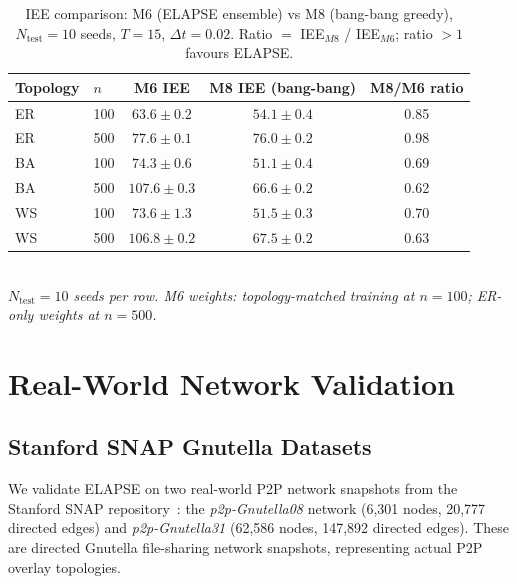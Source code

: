 \documentclass[review,12pt]{elsarticle}
\begin{document}
\begin{table}[htbp]
  \caption{IEE comparison: M6 (ELAPSE ensemble) vs M8 (bang-bang greedy),
           $N_{\mathrm{test}}=10$ seeds, $T=15$, $\Delta t=0.02$.
           Ratio $=$ IEE$_{M8}$ / IEE$_{M6}$; ratio $>1$ favours ELAPSE.}
  \label{tab:greedy}
  \centering
  \small
  \renewcommand{\arraystretch}{1.2}
  \begin{tabular}{llccc}
    \toprule
    Topology & $n$ & M6 IEE & M8 IEE (bang-bang) & M8/M6 ratio \\
    \midrule
    ER & 100 & $63.6\pm 0.2$ & $54.1\pm 0.4$ & 0.85 \\
    ER & 500 & $77.6\pm 0.1$ & $76.0\pm 0.2$ & 0.98 \\
    BA & 100 & $74.3\pm 0.6$ & $51.1\pm 0.4$ & 0.69 \\
    BA & 500 & $107.6\pm 0.3$ & $66.6\pm 0.2$ & 0.62 \\
    WS & 100 & $73.6\pm 1.3$ & $51.5\pm 0.3$ & 0.70 \\
    WS & 500 & $106.8\pm 0.2$ & $67.5\pm 0.2$ & 0.63 \\
    \bottomrule
  \end{tabular}
  \smallskip\\
  \small\textit{$N_{\mathrm{test}}=10$ seeds per row. M6 weights: topology-matched training
  at $n=100$; ER-only weights at $n=500$.}
\end{table}

\section{Real-World Network Validation}
\label{sec:snap}

\subsection{Stanford SNAP Gnutella Datasets}

We validate ELAPSE on two real-world P2P network snapshots from the
Stanford SNAP repository~\cite{snapnets,leskovec2007graph}: the
\emph{p2p-Gnutella08} network (6,301 nodes, 20,777 directed edges) and
\emph{p2p-Gnutella31} (62,586 nodes, 147,892 directed edges). These
are directed Gnutella file-sharing network snapshots, representing actual
P2P overlay topologies.
\end{document}
